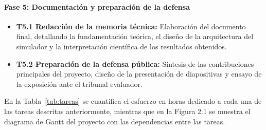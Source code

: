 \paragraph{Fase 5: Documentación y preparación de la defensa}
\begin{itemize}
    \item \textbf{T5.1 Redacción de la memoria técnica:} Elaboración del documento final, detallando la fundamentación teórica, el diseño de la arquitectura del simulador y la interpretación científica de los resultados obtenidos.
    \item \textbf{T5.2 Preparación de la defensa pública:} Síntesis de las contribuciones principales del proyecto, diseño de la presentación de diapositivas y ensayo de la exposición ante el tribunal evaluador.
\end{itemize}

En la Tabla~\ref{tab:tareas} se cuantifica el esfuerzo en horas dedicado a cada una de las tareas descritas anteriormente, mientras que en la Figura 2.1 se muestra el diagrama de Gantt del proyecto con las dependencias entre las tareas.

